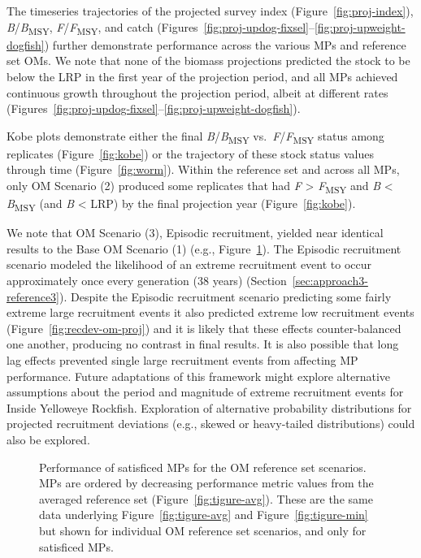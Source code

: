 \documentclass[11pt]{book}
\begin{document}
The timeseries trajectories of the projected survey index (Figure~\ref{fig:proj-index}), \emph{B}/\emph{B}\textsubscript{MSY}, \emph{F}/\emph{F}\textsubscript{MSY}, and catch (Figures~\ref{fig:proj-updog-fixsel}--\ref{fig:proj-upweight-dogfish}) further demonstrate performance across the various MPs and reference set OMs. We note that none of the biomass projections predicted the stock to be below the LRP in the first year of the projection period, and all MPs achieved continuous growth throughout the projection period, albeit at different rates (Figures~\ref{fig:proj-updog-fixsel}--\ref{fig:proj-upweight-dogfish}).

Kobe plots demonstrate either the final \emph{B}/\emph{B}\textsubscript{MSY} vs.~\emph{F}/\emph{F}\textsubscript{MSY} status among replicates (Figure~\ref{fig:kobe}) or the trajectory of these stock status values through time (Figure~\ref{fig:worm}). Within the reference set and across all MPs, only OM Scenario (2) produced some replicates that had \emph{F} \textgreater{} \emph{F}\textsubscript{MSY} and \emph{B} \textless{} \emph{B}\textsubscript{MSY} (and \emph{B} \textless{} LRP) by the final projection year (Figure~\ref{fig:kobe}).

We note that OM Scenario (3), Episodic recruitment, yielded near identical results to the Base OM Scenario (1) (e.g., Figure~\ref{fig:tigure-panel}). The Episodic recruitment scenario modeled the likelihood of an extreme recruitment event to occur approximately once every generation (38 years) (Section~\ref{sec:approach3-reference3}). Despite the Episodic recruitment scenario predicting some fairly extreme large recruitment events it also predicted extreme low recruitment events (Figure~\ref{fig:recdev-om-proj}) and it is likely that these effects counter-balanced one another, producing no contrast in final results. It is also possible that long lag effects prevented single large recruitment events from affecting MP performance. Future adaptations of this framework might explore alternative assumptions about the period and magnitude of extreme recruitment events for Inside Yelloweye Rockfish. Exploration of alternative probability distributions for projected recruitment deviations (e.g., skewed or heavy-tailed distributions) could also be explored.


\begin{figure}[htb]

{\centering {} 

}

\caption{Performance of satisficed MPs for the OM reference set scenarios. MPs are ordered by decreasing performance metric values from the averaged reference set (Figure~\ref{fig:tigure-avg}). These are the same data underlying Figure~\ref{fig:tigure-avg} and Figure~\ref{fig:tigure-min} but shown for individual OM reference set scenarios, and only for satisficed MPs.}\label{fig:tigure-panel}
\end{figure}
\clearpage
\end{document}
